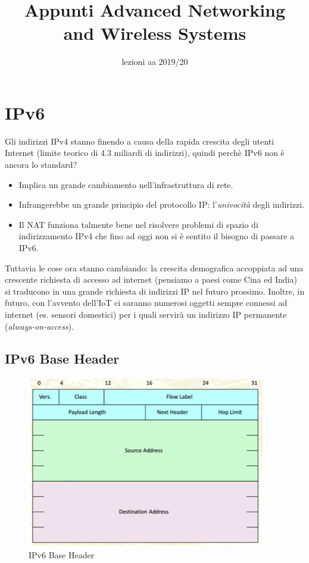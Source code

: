 \documentclass{article}
\title{Appunti Advanced Networking \\ and Wireless Systems}
\author{}
\date{lezioni aa 2019/20}
\begin{document}
\maketitle

\tableofcontents

\newpage
\section{IPv6}
Gli indirizzi IPv4 stanno finendo a causa della rapida crescita degli utenti Internet (limite teorico di 4.3 miliardi di indirizzi), quindi perchè IPv6 non è ancora lo standard?
\begin{itemize}
    \item Implica un grande cambiamento nell'infrastruttura di rete.
    \item Infrangerebbe un grande principio del protocollo IP: l'\textit{univocità} degli indirizzi.
    \item Il NAT funziona talmente bene nel risolvere problemi di spazio di indirizzamento IPv4 che fino ad oggi non si è sentito il bisogno di passare a IPv6.
\end{itemize}
Tuttavia le cose ora stanno cambiando: la crescita demografica accoppiata ad una crescente richiesta di accesso ad internet (pensiamo a paesi come Cina ed India) si traducono in una grande richiesta di indirizzi IP nel futuro prossimo.
Inoltre, in futuro, con l'avvento dell'IoT ci saranno numerosi oggetti sempre connessi ad internet (es. sensori domestici) per i quali servirà un indirizzo IP permanente (\textit{always-on-access}).

\subsection{IPv6 Base Header}
\begin{figure}[H]
\centering
\includegraphics[scale=0.5]{figures/base header.png}
\caption{IPv6 Base Header}
\end{figure}
\end{document}
